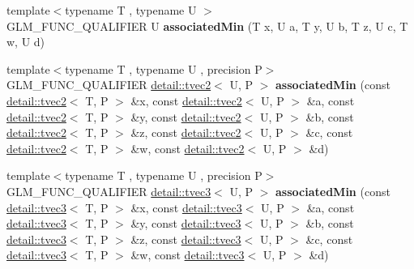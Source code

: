 \begin{DoxyCompactItemize}
\item 
{\footnotesize template$<$typename T , typename U $>$ }\\G\+L\+M\+\_\+\+F\+U\+N\+C\+\_\+\+Q\+U\+A\+L\+I\+F\+I\+ER U {\bfseries associated\+Min} (T x, U a, T y, U b, T z, U c, T w, U d)\hypertarget{namespaceglm_a56ba6db426e264cc11b87d4603a89d48}{}\label{namespaceglm_a56ba6db426e264cc11b87d4603a89d48}

\item 
{\footnotesize template$<$typename T , typename U , precision P$>$ }\\G\+L\+M\+\_\+\+F\+U\+N\+C\+\_\+\+Q\+U\+A\+L\+I\+F\+I\+ER \hyperlink{structglm_1_1detail_1_1tvec2}{detail\+::tvec2}$<$ U, P $>$ {\bfseries associated\+Min} (const \hyperlink{structglm_1_1detail_1_1tvec2}{detail\+::tvec2}$<$ T, P $>$ \&x, const \hyperlink{structglm_1_1detail_1_1tvec2}{detail\+::tvec2}$<$ U, P $>$ \&a, const \hyperlink{structglm_1_1detail_1_1tvec2}{detail\+::tvec2}$<$ T, P $>$ \&y, const \hyperlink{structglm_1_1detail_1_1tvec2}{detail\+::tvec2}$<$ U, P $>$ \&b, const \hyperlink{structglm_1_1detail_1_1tvec2}{detail\+::tvec2}$<$ T, P $>$ \&z, const \hyperlink{structglm_1_1detail_1_1tvec2}{detail\+::tvec2}$<$ U, P $>$ \&c, const \hyperlink{structglm_1_1detail_1_1tvec2}{detail\+::tvec2}$<$ T, P $>$ \&w, const \hyperlink{structglm_1_1detail_1_1tvec2}{detail\+::tvec2}$<$ U, P $>$ \&d)\hypertarget{namespaceglm_af41a217c135ae0278cce57ab86379752}{}\label{namespaceglm_af41a217c135ae0278cce57ab86379752}

\item 
{\footnotesize template$<$typename T , typename U , precision P$>$ }\\G\+L\+M\+\_\+\+F\+U\+N\+C\+\_\+\+Q\+U\+A\+L\+I\+F\+I\+ER \hyperlink{structglm_1_1detail_1_1tvec3}{detail\+::tvec3}$<$ U, P $>$ {\bfseries associated\+Min} (const \hyperlink{structglm_1_1detail_1_1tvec3}{detail\+::tvec3}$<$ T, P $>$ \&x, const \hyperlink{structglm_1_1detail_1_1tvec3}{detail\+::tvec3}$<$ U, P $>$ \&a, const \hyperlink{structglm_1_1detail_1_1tvec3}{detail\+::tvec3}$<$ T, P $>$ \&y, const \hyperlink{structglm_1_1detail_1_1tvec3}{detail\+::tvec3}$<$ U, P $>$ \&b, const \hyperlink{structglm_1_1detail_1_1tvec3}{detail\+::tvec3}$<$ T, P $>$ \&z, const \hyperlink{structglm_1_1detail_1_1tvec3}{detail\+::tvec3}$<$ U, P $>$ \&c, const \hyperlink{structglm_1_1detail_1_1tvec3}{detail\+::tvec3}$<$ T, P $>$ \&w, const \hyperlink{structglm_1_1detail_1_1tvec3}{detail\+::tvec3}$<$ U, P $>$ \&d)\hypertarget{namespaceglm_a79286a03f67ccb6a58c5afa150cc77b3}{}\label{namespaceglm_a79286a03f67ccb6a58c5afa150cc77b3}


\end{DoxyCompactItemize}
